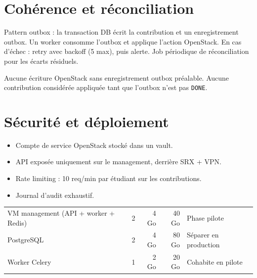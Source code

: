 \section{Cohérence et réconciliation}
Pattern outbox : la transaction DB écrit la contribution et un enregistrement outbox. Un worker consomme l'outbox et applique l'action OpenStack. En cas d'échec : retry avec backoff (5 max), puis alerte. Job périodique de réconciliation pour les écarts résiduels.

\begin{okbox}[Garantie]
Aucune écriture OpenStack sans enregistrement outbox préalable. Aucune contribution considérée appliquée tant que l'outbox n'est pas \texttt{DONE}.
\end{okbox}

\section{Sécurité et déploiement}
\begin{itemize}
  \item Compte de service OpenStack stocké dans un vault.
  \item API exposée uniquement sur le management, derrière SRX + VPN.
  \item Rate limiting : 10 req/min par étudiant sur les contributions.
  \item Journal d'audit exhaustif.
\end{itemize}

\begin{xltabular}{\textwidth}{@{}lrrrX@{}}
\toprule
{} &  &  &  &  \\
\midrule
\endhead
\bottomrule
\endfoot
\bottomrule
\endlastfoot
VM management (API + worker + Redis) & 2 & 4 Go & 40 Go & Phase pilote \\
PostgreSQL                            & 2 & 4 Go & 80 Go & Séparer en production \\
Worker Celery                         & 1 & 2 Go & 20 Go & Cohabite en pilote \\

\end{xltabular}